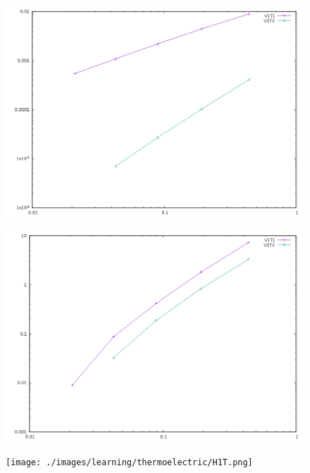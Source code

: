 \documentclass[11pt]{amsart}
\begin{document}
\begin{figure}
\centering\includegraphics[width=4.75truein]{./images/learning/thermoelectric/H1V.png}


\end{figure}

\begin{figure}
\centering\includegraphics[width=4.75truein]{./images/learning/thermoelectric/L2T.png}


\end{figure}

\begin{figure}
\centering\texttt{[image: ./images/learning/thermoelectric/H1T.png]}


\end{figure}
\end{document}
